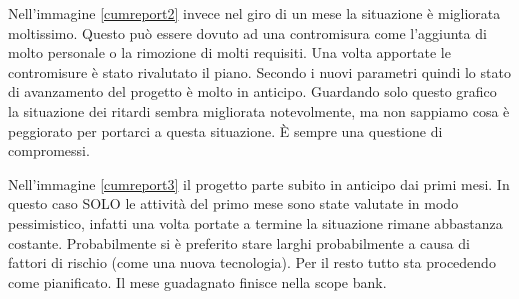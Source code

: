 \noindent Nell'immagine \ref{cumreport2} invece nel giro di un mese la situazione è migliorata moltissimo. Questo può essere dovuto ad una contromisura come l'aggiunta di molto personale o la rimozione di molti requisiti. Una volta apportate le contromisure è stato rivalutato il piano. Secondo i nuovi parametri quindi lo stato di avanzamento del progetto è molto in anticipo. Guardando solo questo grafico la situazione dei ritardi sembra migliorata notevolmente, ma non sappiamo cosa è peggiorato per portarci a questa situazione. È sempre una questione di compromessi.\newline

\noindent Nell'immagine \ref{cumreport3} il progetto parte subito in anticipo dai primi mesi. In questo caso SOLO le attività del primo mese sono state valutate in modo pessimistico, infatti una volta portate a termine la situazione rimane abbastanza costante. Probabilmente si è preferito stare larghi probabilmente a causa di fattori di rischio (come una nuova tecnologia). Per il resto tutto sta procedendo come pianificato. Il mese guadagnato finisce nella scope bank.

